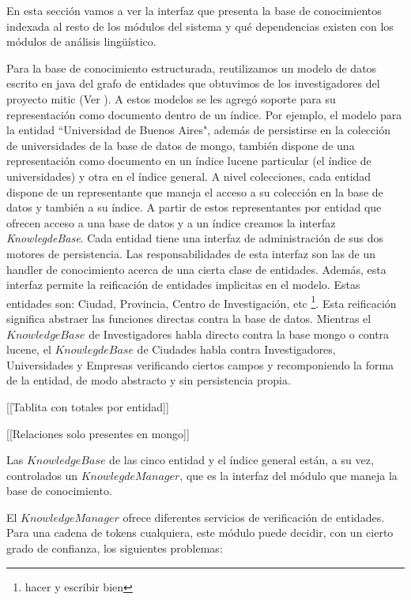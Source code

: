 En esta sección vamos a ver la interfaz que presenta la base de conocimientos indexada 
al resto de los módulos del sistema y qué dependencias existen con los módulos de
análisis lingüístico.

Para la base de conocimiento estructurada, reutilizamos un modelo de datos
escrito en java  del grafo de entidades que obtuvimos de los investigadores del proyecto mitic (Ver ).
A estos modelos se les agregó soporte para su representación como documento dentro de un índice.
Por ejemplo, el modelo para la entidad ``Universidad de Buenos Aires", además de
persistirse en la colección de universidades de la base de datos de mongo, también dispone de una representación como documento en 
un índice lucene particular (el índice de universidades) y otra en el índice general.
A nivel colecciones, cada entidad dispone de un representante que maneja el acceso a su colección en la base de datos y también a su índice. A partir de estos representantes por entidad que ofrecen acceso a una base de datos y a un índice creamos la interfaz \emph{KnowlegdeBase}. 
Cada entidad tiene una interfaz de administración de sus dos motores de persistencia. Las responsabilidades de esta interfaz son las de un handler de conocimiento acerca de una cierta clase de entidades. 
Además, esta interfaz permite la reificación de entidades implicitas en el modelo. Estas entidades son: Ciudad, Provincia, Centro de Investigación, etc \footnote{hacer y escribir bien}. Esta reificación significa abstraer las funciones directas contra la base de datos. Mientras el $KnowledgeBase$ de Investigadores habla directo contra la base mongo o contra lucene, el $KnowlegdeBase$ de Ciudades habla contra Investigadores, Universidades y Empresas verificando ciertos campos y recomponiendo la forma de la entidad, de modo abstracto y sin persistencia propia. 

[[Tablita con totales por entidad]]

\bigskip

[[Relaciones solo presentes en mongo]]

\bigskip

Las $KnowledgeBase$ de las cinco entidad y el índice general están, a su vez, controlados un $KnowlegdeManager$, que es la interfaz del módulo que maneja la base de conocimiento. 

El $KnowledgeManager$ ofrece diferentes servicios de verificación de entidades. Para una cadena de tokens cualquiera, este módulo puede decidir, con un cierto grado de confianza, los siguientes problemas:

